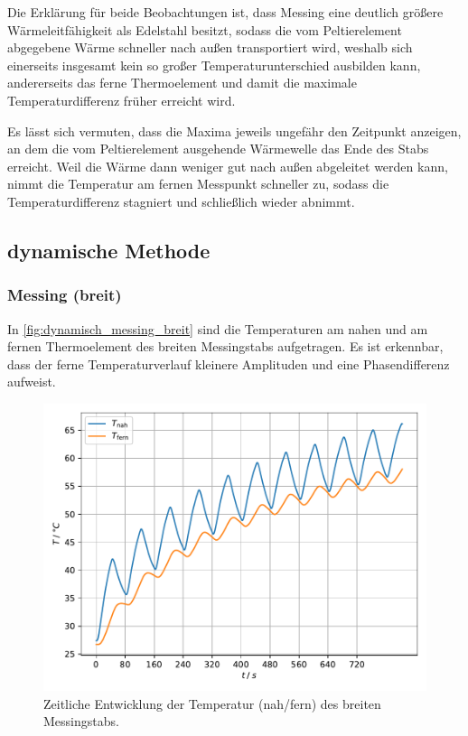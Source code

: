 Die Erklärung für beide Beobachtungen ist,
dass Messing eine deutlich größere Wärmeleitfähigkeit als Edelstahl besitzt,
sodass die vom Peltierelement abgegebene Wärme schneller nach außen transportiert wird,
weshalb sich einerseits insgesamt kein so großer Temperaturunterschied ausbilden kann,
andererseits das ferne Thermoelement und damit die maximale Temperaturdifferenz früher erreicht wird.

Es lässt sich vermuten, dass die Maxima jeweils ungefähr den Zeitpunkt anzeigen,
an dem die vom Peltierelement ausgehende Wärmewelle das Ende des Stabs erreicht.
Weil die Wärme dann weniger gut nach außen abgeleitet werden kann,
nimmt die Temperatur am fernen Messpunkt schneller zu,
sodass die Temperaturdifferenz stagniert und schließlich wieder abnimmt.


\subsection{dynamische Methode}
\label{sec:auswertung_dynamisch}

\subsubsection{Messing (breit)}

In \autoref{fig:dynamisch_messing_breit} sind die Temperaturen am nahen und am fernen Thermoelement des breiten Messingstabs aufgetragen.
Es ist erkennbar, dass der ferne Temperaturverlauf kleinere Amplituden und eine Phasendifferenz aufweist.

\begin{figure}[H]
  \centering
  \includegraphics{build/plot_dynamisch_messing_breit.pdf}
  \caption{Zeitliche Entwicklung der Temperatur (nah/fern) des breiten Messingstabs.}
  \label{fig:dynamisch_messing_breit}
\end{figure}

